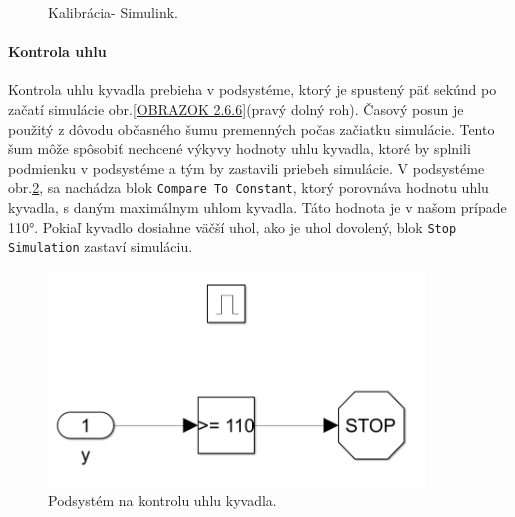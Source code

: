 \begin{figure}[!tbh]
	\hfill
	\hfill
	\hfill
	\caption{Kalibrácia- Simulink.}\label{OBRAZOK 2.6.8}
\end{figure}

\paragraph{Kontrola uhlu}

Kontrola uhlu kyvadla prebieha v podsystéme, ktorý je spustený päť sekúnd po začatí simulácie obr.\ref{OBRAZOK 2.6.6}(pravý dolný roh). Časový posun je použitý z dôvodu občasného šumu premenných počas začiatku simulácie. Tento šum môže spôsobiť nechcené výkyvy hodnoty uhlu kyvadla, ktoré by splnili podmienku v podsystéme a tým by zastavili priebeh simulácie. V podsystéme obr.\ref{OBRAZOK 2.6.9}, sa nachádza blok \verb|Compare To Constant|, ktorý porovnáva hodnotu uhlu kyvadla, s daným maximálnym uhlom kyvadla. Táto hodnota je v našom prípade 110°. Pokiaľ kyvadlo dosiahne väčší uhol, ako je uhol dovolený, blok \verb|Stop Simulation| zastaví simuláciu.  

\begin{figure}[!tbh]
	\centering
	\includegraphics[width=100mm]{obr/AngleControl.png}
	\caption{Podsystém na kontrolu uhlu kyvadla.}\label{OBRAZOK 2.6.9}
\end{figure}

